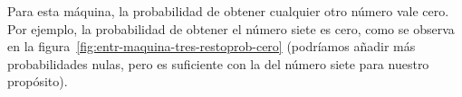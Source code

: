 Para esta máquina, la probabilidad de obtener cualquier otro número vale cero.
Por ejemplo, la probabilidad de obtener el número siete es cero, como se
observa en la figura~\ref{fig:entr-maquina-tres-restoprob-cero}
(podríamos añadir más probabilidades nulas, pero es suficiente con la
del número siete para nuestro propósito).
\begin{figure}[ht]
  \centering
  \newcommand{\colorMaquinaInt}{green!70!black!40}
  \newcommand{\colorMaquinaExt}{black}
  \newcommand{\colorEtiquetaInt}{green!70!black!35}
  \newcommand{\colorEtiquetaExt}{green!45!black}
  \newcommand{\colorBotonInt}{red}
  \newcommand{\colorBotonExt}{black}
  \newcommand{\colorFlechaSalida}{black!60}
  \newcommand{\colorNumeroInt}{orange!40}
  \newcommand{\colorNumeroExt}{black!60}
  \newcommand{\colorNumFalsoInt}{black!10}
  \newcommand{\colorNumFalsoExt}{black!20}
  \def\scl{1}


\end{figure}
